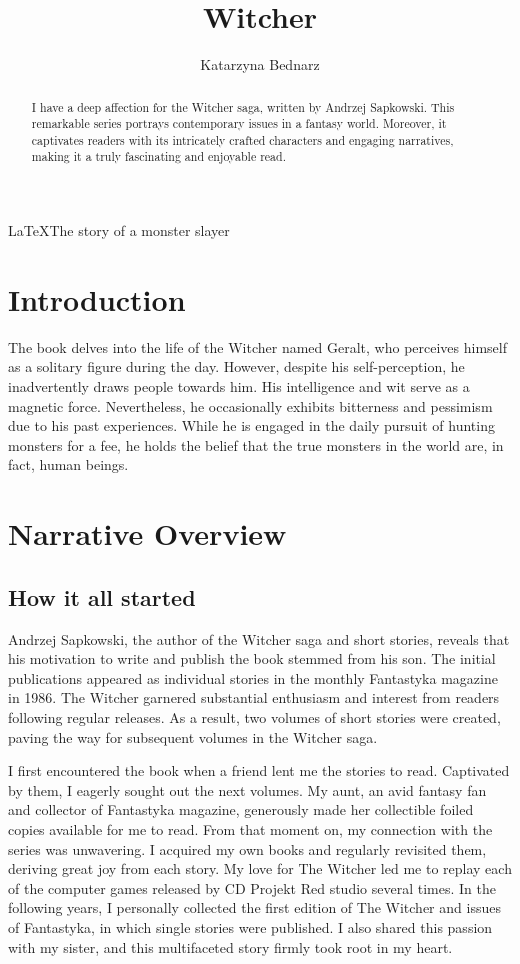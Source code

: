 \documentclass{article}
\title{Witcher}
\author{Katarzyna Bednarz}
\begin{document}
\maketitle

\begingroup
\centering 
\LaTeX{The story of a monster slayer}

\endgroup

\begin{abstract}
I have a deep affection for the Witcher saga, written by Andrzej Sapkowski. This remarkable series portrays contemporary issues in a fantasy world. Moreover, it captivates readers with its intricately crafted characters and engaging narratives, making it a truly fascinating and enjoyable read.
\end{abstract}

\section{Introduction}


The book delves into the life of the Witcher named Geralt, who perceives himself as a solitary figure during the day. However, despite his self-perception, he inadvertently draws people towards him. His intelligence and wit serve as a magnetic force. Nevertheless, he occasionally exhibits bitterness and pessimism due to his past experiences. While he is engaged in the daily pursuit of hunting monsters for a fee, he holds the belief that the true monsters in the world are, in fact, human beings.


\section{Narrative Overview}

\subsection{How it all started}

Andrzej Sapkowski, the author of the Witcher saga and short stories, reveals that his motivation to write and publish the book stemmed from his son. The initial publications appeared as individual stories in the monthly Fantastyka magazine in 1986. The Witcher garnered substantial enthusiasm and interest from readers following regular releases. As a result, two volumes of short stories were created, paving the way for subsequent volumes in the Witcher saga.

I first encountered the book when a friend lent me the stories to read. Captivated by them, I eagerly sought out the next volumes. My aunt, an avid fantasy fan and collector of Fantastyka magazine, generously made her collectible foiled copies available for me to read. From that moment on, my connection with the series was unwavering. I acquired my own books and regularly revisited them, deriving great joy from each story. My love for The Witcher led me to replay each of the computer games released by CD Projekt Red studio several times. In the following years, I personally collected the first edition of The Witcher and issues of Fantastyka, in which single stories were published. I also shared this passion with my sister, and this multifaceted story firmly took root in my heart.
\end{document}
